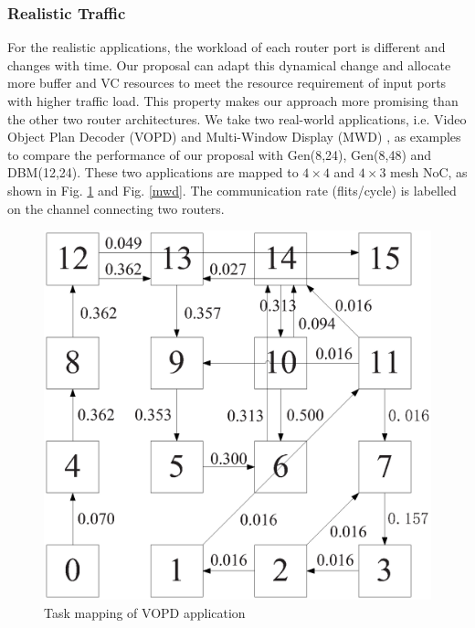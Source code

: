\documentclass[paper]{ieice}
\begin{document}
\subsubsection{Realistic Traffic}
For the realistic applications, the workload of each router port is different and changes with time. Our proposal can adapt this dynamical change and allocate more buffer and VC resources to meet the resource requirement of input ports with higher traffic load. This property makes our approach more promising than the other two router architectures. We take two real-world applications, i.e. Video Object Plan Decoder (VOPD) \cite{6553191} and Multi-Window Display (MWD) \cite{1374853}, as examples to compare the performance of our proposal with Gen(8,24), Gen(8,48) and DBM(12,24). These two applications are mapped to $4\times 4$ and $4\times 3$ mesh NoC, as shown in Fig. \ref{vopd} and Fig. \ref{mwd}. The communication rate (flits/cycle) is labelled on the channel connecting two routers.
\begin{figure}[h]
  \centering
  \includegraphics[scale=0.4]{figures/vopd.eps}
  \caption{Task mapping of VOPD application}\label{vopd}
\end{figure}
\end{document}
